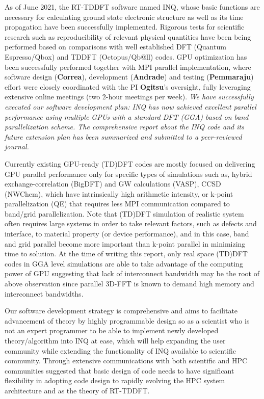 As of June 2021, the RT-TDDFT software named INQ, whose basic functions are necessary for calculating ground state electronic structure as well as its time propagation have been successfully implemented. 
Rigorous tests for scientific research such as reproducibility of relevant physical quantities have been being performed based on comparisons with well established DFT (Quantum Espresso/Qbox) and TDDFT (Octopus/Qb@ll) codes. 
GPU optimization has been successfully performed together with MPI parallel implementation, where software design ({\bf Correa}), development ({\bf Andrade}) and testing ({\bf Pemmaraju}) effort were closely coordinated with the PI {\bf Ogitsu}'s oversight, fully leveraging extensive online meetings (two 2-hour meetings per week). 
\emph{
	We have successfully executed our software development plan: INQ has now achieved excellent parallel performance using multiple GPUs with a standard DFT (GGA) based on band parallelization scheme. 
	The comprehensive report about the INQ code and its future extension plan has been summarized and submitted to a peer-reviewed journal. \cite{andrade2021inq}
}

Currently existing GPU-ready (TD)DFT codes are mostly focused on delivering GPU parallel performance only for specific types of simulations such as, hybrid exchange-correlation (BigDFT) \cite{BigDFT2018} and GW calculations (VASP),\cite{vasp2012,vasp2012b,vasp2018,vasp2019} CCSD (NWChem),\cite{NWChem2013} which have intrinsically high arithmetic intensity, or k-point parallelization (QE)\cite{QE2017,QE2020} that requires less MPI communication compared to band/grid parallelization. 
Note that (TD)DFT simulation of realistic system often requires large systems in order to take relevant factors, such as defects and interface, to material property (or device performance), and in this case, band and grid parallel become more important than k-point parallel in minimizing time to solution. 
At the time of writing this report, only real space (TD)DFT codes\cite{andrade2012time,andrade2013real,SparcX2021} in GGA level simulations are able to take advantage of the computing power of GPU suggesting that lack of interconnect bandwidth may be the root of above observation since parallel 3D-FFT is known to demand high memory and interconnect bandwidths.\cite{heFFTe2020}

Our software development strategy is comprehensive and aims to facilitate advancement of theory by highly programmable design so as a scientist who is not an expert programmer to be able to implement newly developed theory/algorithm into INQ at ease, which will help expanding the user community while extending the functionality of INQ available to scientific community. 
Through extensive communications with both scientific and HPC communities suggested that basic design of code needs to have significant flexibility in adopting code design to rapidly evolving the HPC system architecture and as the theory of RT-TDDFT. 

